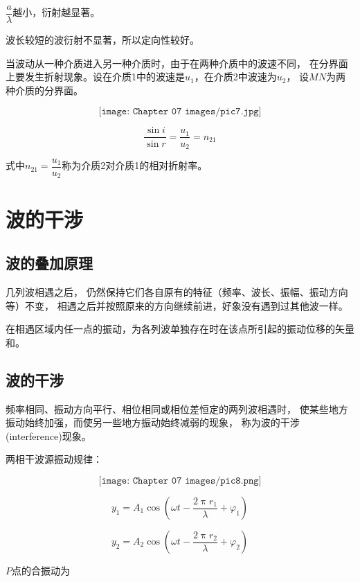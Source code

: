 \documentclass[
	12pt, %
	a4paper, %
]{myLegrandOrangeBook}
\begin{document}
    \(\dfrac{a }{\lambda}\)越小，衍射越显著。

    波长较短的波衍射不显著，所以定向性较好。

    \begin{theorem}[折射定律]
    当波动从一种介质进入另一种介质时，由于在两种介质中的波速不同，
    在分界面上要发生折射现象。设在介质1中的波速是\(u_1\)，在介质2中波速为\(u_2\)，
    设\(MN \)为两种介质的分界面。

    \[
        \texttt{[image: Chapter 07 images/pic7.jpg]}
    \]

    \begin{equation}
        \frac{\sin i}{\sin r}=\frac{u_1}{u_2}=n_{21}
    \end{equation}

    式中\(n_{21}=\dfrac{u_1}{u_2}\)称为介质2对介质1的相对折射率。
\end{theorem}

\section{波的干涉}

\subsection{波的叠加原理}

    几列波相遇之后， 仍然保持它们各自原有的特征（频率、波长、振幅、振动方向等）不变，
    相遇之后并按照原来的方向继续前进，好象没有遇到过其他波一样。

    在相遇区域内任一点的振动，为各列波单独存在时在该点所引起的振动位移的矢量和。
    
\subsection{波的干涉}

    频率相同、振动方向平行、相位相同或相位差恒定的两列波相遇时，
    使某些地方振动始终加强，而使另一些地方振动始终减弱的现象，
    称为波的干涉(interference)现象。

    两相干波源振动规律：

    \[
        \texttt{[image: Chapter 07 images/pic8.png]}
    \]

    $$
        y_1=A_1 \cos \left(\omega t-\frac{2 \uppi r_1}{\lambda}+\varphi_1\right)
    $$

    $$
        y_2=A_2 \cos \left(\omega t-\frac{2 \uppi r_2}{\lambda}+\varphi_2\right)
    $$

    \(P \)点的合振动为
\end{document}

